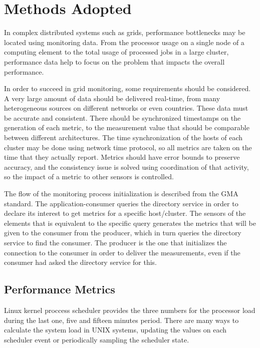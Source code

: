 \section{Methods Adopted}

In complex distributed systems such as grids, performance bottlenecks may be located using monitoring data. From the processor usage on a single node of a computing element to the total usage of processed jobs in a large cluster, performance data help to focus on the problem that impacts the overall performance.

In order to succeed in grid monitoring, some requirements should be considered. A very large amount of data should be delivered real-time, from many heterogeneous sources on different networks or even countries. These data must be accurate and consistent. There should be synchronized timestamps on the generation of each metric, to the measurement value that should be comparable between different architectures. The time synchronization of the hosts of each cluster may be done using network time protocol, so all metrics are taken on the time that they actually report. Metrics should have error bounds to preserve accuracy, and the consistency issue is solved using coordination of that activity, so the impact of a metric to other sensors is controlled.

The flow of the monitoring process initialization is described from the GMA standard. The application-consumer queries the directory service in order to declare its interest to get metrics for a specific host/cluster. The sensors of the elements that is equivalent to the specific query generates the metrics that will be given to the consumer from the producer, which in turn queries the directory service to find the consumer. The producer is the one that initializes the connection to the consumer in order to deliver the measurements, even if the consumer had asked the directory service for this. \cite{balatonuse}


\subsection{Performance Metrics}

Linux kernel proccess scheduler provides the three numbers for the processor load during the last one, five and fifteen minutes period. There are many ways to calculate the system load in UNIX systems, updating the values on each scheduler event or periodically sampling the scheduler state.

